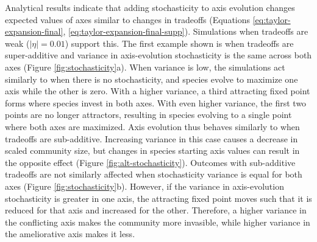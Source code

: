 Analytical results indicate that adding stochasticity to axis evolution
changes expected values of axes similar to changes in tradeoffs
(Equations \ref{eq:taylor-expansion-final}, \ref{eq:taylor-expansion-final-supp}).
Simulations when tradeoffs are weak ($| \eta |= 0.01$) support this.
The first example shown is when tradeoffs are super-additive and 
variance in axis-evolution stochasticity is the same across both axes
(Figure \ref{fig:stochasticity}a).
When variance is low, the simulations act similarly to when there is no
stochasticity, and species evolve to maximize one axis while the other is zero.
With a higher variance, a third attracting fixed point forms where species
invest in both axes.
With even higher variance, the first two points are no longer attractors,
resulting in species evolving to a single point where both axes are maximized.
Axis evolution thus behaves similarly to when tradeoffs are sub-additive.
Increasing variance in this case causes a decrease in scaled community size,
but changes in species starting axis values can result in the 
opposite effect (Figure \ref{fig:alt-stochasticity}).
Outcomes with sub-additive tradeoffs are not similarly affected when
stochasticity variance is equal for both axes (Figure \ref{fig:stochasticity}b).
However, if the variance in axis-evolution stochasticity is greater in one axis,
the attracting fixed point moves such that it is reduced for that axis
and increased for the other.
Therefore, a higher variance in the conflicting axis makes the community
more invasible, while higher variance in the ameliorative axis makes it less.

